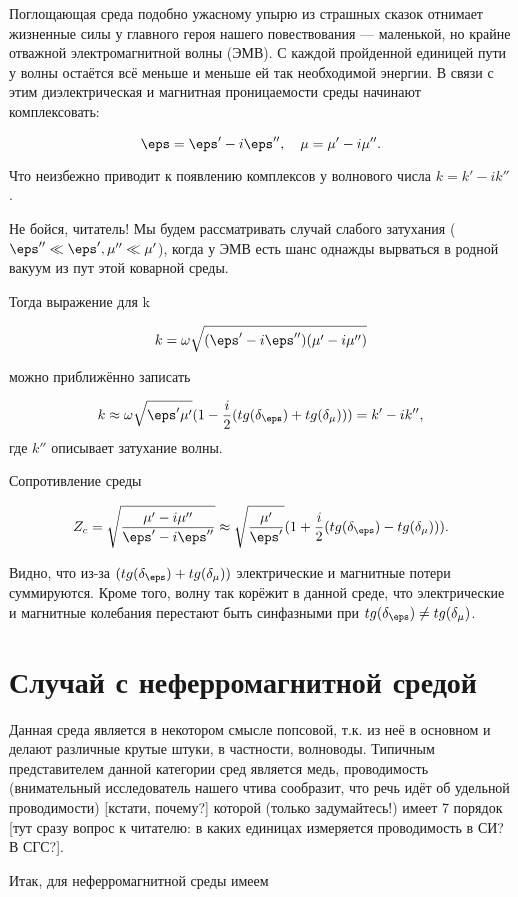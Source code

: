 Поглощающая среда подобно ужасному упырю из страшных сказок отнимает жизненные силы у главного героя
нашего повествования --- маленькой, но
крайне отважной электромагнитной волны (ЭМВ). С каждой пройденной единицей пути у волны остаётся всё меньше и меньше
ей так необходимой энергии. В связи с этим диэлектрическая и магнитная проницаемости среды начинают комплексовать:

$$\eps = \eps'-i\eps'',\quad \mu = \mu'-i\mu''. $$

Что неизбежно приводит к появлению комплексов у волнового числа $k = k' - ik''$.


Не бойся, читатель! Мы будем рассматривать случай слабого затухания ($\eps''\ll\eps', \mu''\ll \mu'$), когда
 у ЭМВ есть шанс однажды вырваться в родной вакуум из пут этой коварной среды.


Тогда выражение для k

$$k=\omega \sqrt{(\eps'-i\eps'')(\mu'-i\mu'')} $$

можно приближённо записать

$$k \approx \omega \sqrt{\eps'\mu'}(1-\frac{i}{2}(tg(\delta_{\eps})+tg(\delta_{\mu})))=k'-ik'', $$
где $k''$ описывает затухание волны.

Сопротивление среды

$$Z_c=\sqrt{\frac{\mu'-i\mu''}{\eps'-i\eps''}}
\approx \sqrt{\frac{\mu'}{\eps'}}(1+\frac{i}{2}(tg(\delta_{\eps})-tg(\delta_{\mu}))). $$

Видно, что из-за $(tg(\delta_{\eps})+tg(\delta_{\mu}))$ электрические и магнитные
потери суммируются. Кроме того, волну так корёжит в данной среде, что электрические и магнитные колебания
перестают быть синфазными при $tg(\delta_{\eps}) \ne tg(\delta_{\mu})$.

\section{Случай с неферромагнитной средой}

Данная среда является в некотором смысле попсовой, т.к. из неё в основном и делают различные
крутые штуки, в частности, волноводы. Типичным представителем данной категории сред является медь,
проводимость (внимательный исследователь нашего чтива сообразит, что речь идёт об удельной проводимости)
[кстати, почему?] которой (только задумайтесь!) имеет 7 порядок [тут сразу вопрос к читателю:
в каких единицах измеряется проводимость в СИ? В СГС?].


Итак, для неферромагнитной среды имеем

